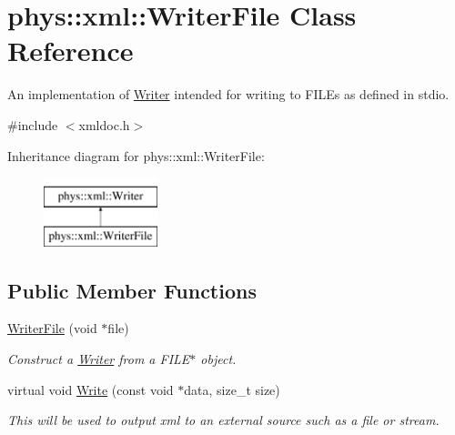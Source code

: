\hypertarget{classphys_1_1xml_1_1WriterFile}{
\section{phys::xml::WriterFile Class Reference}
\label{dc/d53/classphys_1_1xml_1_1WriterFile}
}


An implementation of \hyperlink{classphys_1_1xml_1_1Writer}{Writer} intended for writing to FILEs as defined in stdio.  




{\ttfamily \#include $<$xmldoc.h$>$}

Inheritance diagram for phys::xml::WriterFile:\begin{figure}[H]
\begin{center}
\leavevmode
\includegraphics[height=2.000000cm]{dc/d53/classphys_1_1xml_1_1WriterFile}
\end{center}
\end{figure}
\subsection*{Public Member Functions}
\begin{DoxyCompactItemize}
\item 
\hyperlink{classphys_1_1xml_1_1WriterFile_aba665d4dc17c956798a80cb4e8c2774d}{WriterFile} (void $\ast$file)
\begin{DoxyCompactList}\small\item\em Construct a \hyperlink{classphys_1_1xml_1_1Writer}{Writer} from a FILE$\ast$ object. \item\end{DoxyCompactList}\item 
virtual void \hyperlink{classphys_1_1xml_1_1WriterFile_a4c4348e30dc03b22f7d4ee15bd386ab2}{Write} (const void $\ast$data, size\_\-t size)
\begin{DoxyCompactList}\small\item\em This will be used to output xml to an external source such as a file or stream. \item\end{DoxyCompactList}\end{DoxyCompactItemize}


